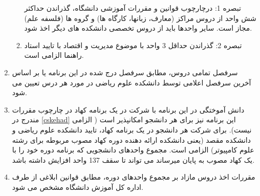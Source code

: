 \documentclass{article}
\begin{document}
\begin{enumerate}
\begin{enumerate}
    تبصره 1: درچارچوب قوانین و مقررات آموزشی دانشگاه، گذراندن حداکثر شش واحد از دروس مراکز (معارف، زبانها، کارگاه ها) و گروه ها (فلسفه علم) مجاز است. سایر واحدها باید از دروس تخصصی دانشکده های دیگر اخذ شود.
    \item
    تبصره 2:  گذراندن حداقل 3 واحد با موضوع مدیریت و اقتصاد با تایید استاد راهنما الزامی است.
	\end{enumerate}
        \item
         سرفصل تمامی دروس، مطابق سرفصل درج شده در این برنامه یا بر اساس آخرین سرفصل اعلامی توسط دانشکده علوم ریاضی در مورد هر درس تعیین می شود.
        \item
         دانش آموختگی در این برنامه با شرکت در یک برنامه کهاد در چارچوب مقررات مندرج در 
         \autoref{cskehad}
         این برنامه نیز برای هر دانشجو امکانپذیر است ( الزامی نیست). برای شرکت هر دانشجو در یک برنامه کهاد، تایید دانشکده علوم ریاضی و دانشکده مقصد (یعنی دانشکده ارائه دهنده دوره کهاد مصوب مربوطه برای رشته علوم کامپیوتر) الزامی است. مجموع واحدهای دانشجویی که برنامه دوره خود را با یک کهاد مصوب به پایان میرساند می تواند تا سقف 137 واحد افزایش داشته باشد.
        \item مقررات اخذ دروس مازاد بر مجموع واحدهای دوره، مطابق قوانین ابلاغی از طرف اداره کل آموزش دانشگاه مشخص می شود.
    \end{enumerate}
\end{document}
